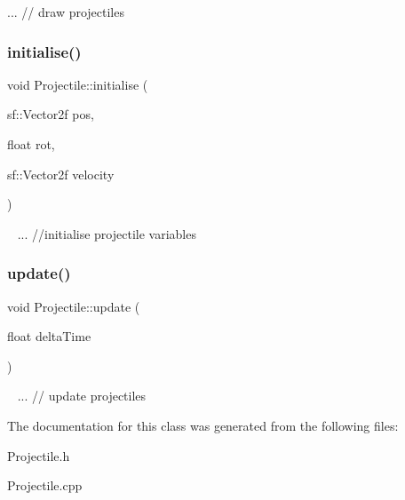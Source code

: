 ... // draw projectiles\mbox{\label{class_projectile_a9b1fe47f547a234439f87adc8759df8d}} 
\subsubsection{\texorpdfstring{initialise()}{initialise()}}
{\footnotesize\ttfamily void Projectile\+::initialise (\begin{DoxyParamCaption}\item[{sf\+::\+Vector2f}]{pos,  }\item[{float}]{rot,  }\item[{sf\+::\+Vector2f}]{velocity }\end{DoxyParamCaption})}

~\newline
... //initialise projectile variables\mbox{\label{class_projectile_a5bc646de87829b911d6817a6478c353e}} 
\subsubsection{\texorpdfstring{update()}{update()}}
{\footnotesize\ttfamily void Projectile\+::update (\begin{DoxyParamCaption}\item[{float}]{delta\+Time }\end{DoxyParamCaption})}

~\newline
... // update projectiles

The documentation for this class was generated from the following files\+:\begin{DoxyCompactItemize}
\item 
Projectile.\+h\item 
Projectile.\+cpp\end{DoxyCompactItemize}
